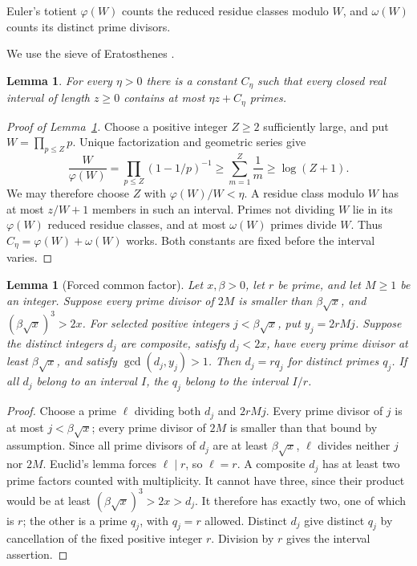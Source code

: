 \documentclass[11pt]{article}
\newtheorem{lemma}[theorem]{Lemma}
\theoremstyle{remark}
\begin{document}
Euler's totient $\varphi(W)$ counts the reduced residue classes modulo $W$,
and $\omega(W)$ counts its distinct prime divisors.

We use the sieve of Eratosthenes \cite{sievebook}.
\begin{lemma}\label{lem:capacity}
For every $\eta>0$ there is a constant $C_\eta$ such that every
closed real interval of length $z\geq0$ contains at most
$\eta z+C_\eta$ primes.
\end{lemma}
\begin{proof}[Proof of Lemma~\ref{lem:capacity}]
Choose a positive integer $Z\geq2$ sufficiently large, and put
$W=\prod_{p\leq Z}p$. Unique factorization and geometric series give
\[
 \frac{W}{\varphi(W)}
 =\prod_{p\leq Z}(1-1/p)^{-1}
 \geq\sum_{m=1}^Z\frac1m\geq\log(Z+1).
\]
We may therefore choose $Z$ with $\varphi(W)/W<\eta$.
A residue class modulo $W$ has at most $z/W+1$ members in such
an interval. Primes not dividing $W$ lie in its $\varphi(W)$ reduced
residue classes, and at most $\omega(W)$ primes divide $W$.
Thus $C_\eta=\varphi(W)+\omega(W)$ works. Both constants are fixed
before the interval varies.
\end{proof}

\begin{lemma}[Forced common factor]\label{lem:factor}
Let $x,\beta>0$, let $r$ be prime, and let $M\geq1$ be an integer.
Suppose every prime divisor of $2M$ is smaller than $\beta\sqrt x$,
and $(\beta\sqrt x)^3>2x$. For selected positive integers
$j<\beta\sqrt x$, put $y_j=2rMj$. Suppose the distinct integers
$d_j$ are composite, satisfy $d_j<2x$, have every prime divisor at
least $\beta\sqrt x$, and satisfy $\gcd(d_j,y_j)>1$.
Then $d_j=rq_j$ for distinct primes $q_j$. If all $d_j$ belong to
an interval $I$, the $q_j$ belong to the interval $I/r$.
\end{lemma}
\begin{proof}
Choose a prime $\ell$ dividing both $d_j$ and $2rMj$.
Every prime divisor of $j$ is at most $j<\beta\sqrt x$; every prime
divisor of $2M$ is smaller than that bound by assumption.
Since all prime divisors of $d_j$ are at least $\beta\sqrt x$,
$\ell$ divides neither $j$ nor $2M$. Euclid's lemma forces
$\ell\mid r$, so $\ell=r$. A composite $d_j$ has at least two
prime factors counted with multiplicity. It cannot have three,
since their product would be at least $(\beta\sqrt x)^3>2x>d_j$.
It therefore has exactly two, one of which is $r$; the other is a
prime $q_j$, with $q_j=r$ allowed. Distinct $d_j$ give distinct
$q_j$ by cancellation of the fixed positive integer $r$.
Division by $r$ gives the interval assertion.
\end{proof}
\end{document}
